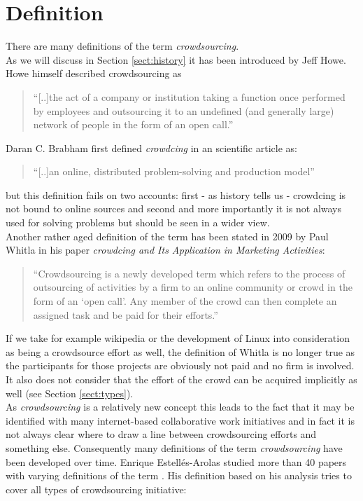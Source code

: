 \documentclass{acm_proc_article-sp}
\begin{document}
\section{Definition}
There are many definitions of the term \textit{crowdsourcing}. \\
As we will discuss in Section \ref{sect:history} it has been introduced by Jeff Howe\cite{howe:rise}. Howe himself described crowdsourcing as
\begin{quote}
``[..]the act of a company or institution taking a function once performed by employees and outsourcing it to an undefined (and generally large) network of people in the form of an open call.''
\end{quote}
Daran C. Brabham first defined \textit{crowdcing} in an scientific article \cite{brabham:crowd1} as:
\begin{quote}
 ``[..]an online, distributed problem-solving and production model''
\end{quote}
but this definition fails on two accounts: first - as history tells us - crowdcing is not bound to online sources and second and more importantly it is not always used for solving problems but should be seen in a wider view.\\
Another rather aged definition of the term has been stated in 2009 by Paul Whitla in his paper \textit{crowdcing and Its Application in Marketing Activities}\cite{whitla:crowd}:
\begin{quote}
``Crowdsourcing is a newly developed term which refers to the process of outsourcing of activities by a firm to an online community or crowd in the form of an ‘open call’. Any member of the crowd can then complete an assigned task and be paid for their efforts.''
\end{quote}
If we take for example wikipedia or the development of Linux into consideration as being a crowdsource effort as well, the definition of Whitla is no longer true as the participants for those projects are obviously not paid and no firm is involved. It also does not consider that the effort of the crowd can be acquired implicitly as well (see Section \ref{sect:types}).\\
As \textit{crowdsourcing} is a relatively new concept this leads to the fact that it may be identified with many internet-based collaborative work initiatives and in fact it is not always clear where to draw a line between crowdsourcing efforts and something else. Consequently many definitions of the term \textit{crowdsourcing} have been developed over time. Enrique Estellés-Arolas studied more than 40 papers with varying definitions of the term \cite{arolas:definition}. His definition based on his analysis tries to cover all types of crowdsourcing initiative:
\end{document}
